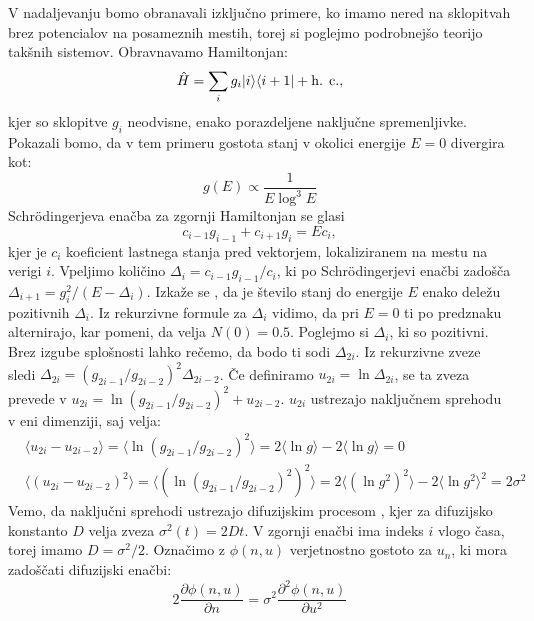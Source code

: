 V nadaljevanju bomo obranavali izključno primere, ko imamo nered na sklopitvah brez potencialov na posameznih mestih, torej si poglejmo podrobnejšo teorijo takšnih sistemov.
Obravnavamo Hamiltonjan:
\begin{equation}
\hat{H} = \sum_i g_i | i \rangle \langle i + 1 | + \textup{h. c.},
\end{equation}
kjer so sklopitve $g_i$ neodvisne, enako porazdeljene naključne spremenljivke.
Pokazali bomo, da v tem primeru gostota stanj v okolici energije $E=0$ divergira kot:
\begin{equation}
g(E) \propto \frac{1}{E \log^3 E}
\end{equation}
Schrödingerjeva enačba za zgornji Hamiltonjan se glasi
\begin{equation}
c_{i-1} g_{i-1} + c_{i+1} g_i = E c_i,
\end{equation}
kjer je $c_i$ koeficient lastnega stanja pred vektorjem, lokaliziranem na mestu na verigi $i$.
Vpeljimo količino $\Delta_i = c_{i-1} g_{i-1} / c_i$, ki po Schrödingerjevi enačbi zadošča $\Delta_{i+1} = g_i^2 / (E- \Delta_i)$. Izkaže se \cite{dokazgostota}, da je število stanj do energije $E$ enako deležu pozitivnih $\Delta_i$. Iz rekurzivne formule za $\Delta_i$ vidimo, da pri $E=0$ ti po predznaku alternirajo, kar pomeni, da velja $N(0) = 0.5$.
Poglejmo si $\Delta_i$, ki so pozitivni. Brez izgube splošnosti lahko rečemo, da bodo ti sodi $\Delta_{2i}$.
Iz rekurzivne zveze sledi $\Delta_{2i} = (g_{2i-1}/g_{2i-2})^2 \Delta_{2i-2}$.
Če definiramo $u_{2i} = \ln \Delta_{2i}$, se ta zveza prevede v $u_{2i} = \ln (g_{2i-1}/g_{2i-2})^2 + u_{2i-2}$.
$u_{2i}$ ustrezajo naključnem sprehodu v eni dimenziji, saj velja:
\begin{align}
&\langle u_{2i} - u_{2i-2} \rangle = \langle \ln (g_{2i-1}/g_{2i-2})^2 \rangle = 2 \langle \ln g \rangle - 2 \langle \ln g \rangle = 0 \\
&\langle (u_{2i} - u_{2i-2})^2 \rangle = \langle (\ln (g_{2i-1}/g_{2i-2})^2)^2 \rangle = 2 \langle (\ln g^2)^2 \rangle - 2 \langle \ln g^2 \rangle^2 = 2 \sigma^2 
\end{align}
Vemo, da naključni sprehodi ustrezajo difuzijskim procesom \cite{diffusion}, kjer za difuzijsko konstanto $D$ velja zveza $\sigma^2(t) = 2Dt$. V zgornji enačbi ima indeks $i$ vlogo časa, torej imamo $D=\sigma^2 / 2$. Označimo z $\phi (n, u)$ verjetnostno gostoto za $u_n$, ki mora zadoščati difuzijski enačbi:
\begin{equation}
2 \frac{\partial \phi (n,u)}{\partial n} = \sigma^2 \frac{\partial^2 \phi (n,u)}{\partial u^2}
\end{equation}
